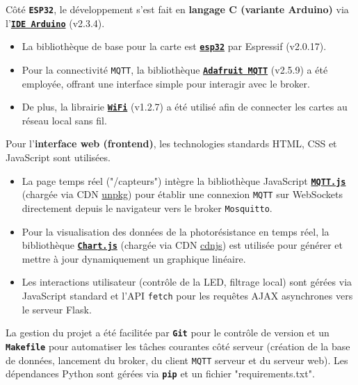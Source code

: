 \documentclass[12pt]{article}
\begin{document}
Côté \textbf{\texttt{ESP32}}, le développement s'est fait en \textbf{langage C (variante Arduino)} via l'\textbf{\href{https://www.arduino.cc/}{\texttt{IDE Arduino}}} (v2.3.4).
\begin{itemize}
    \item La bibliothèque de base pour la carte est \textbf{\href{https://github.com/espressif/arduino-esp32}{\texttt{esp32}}} par Espressif (v2.0.17).
    \item Pour la connectivité \texttt{MQTT}, la bibliothèque \textbf{\href{https://docs.arduino.cc/libraries/adafruit-mqtt-library/}{\texttt{Adafruit MQTT}}} (v2.5.9) a été employée, offrant une interface simple pour interagir avec le broker.
    \item De plus, la librairie \textbf{\href{https://docs.arduino.cc/libraries/wifi/}{\texttt{WiFi}}} (v1.2.7) a été utilisé afin de connecter les cartes au réseau local sans fil.
\end{itemize} \hfill \break

Pour l'\textbf{interface web (frontend)}, les technologies standards HTML, CSS et JavaScript sont utilisées.
\begin{itemize}
    \item La page temps réel ("/capteurs") intègre la bibliothèque JavaScript \textbf{\href{https://github.com/mqttjs/MQTT.js/}{\texttt{MQTT.js}}} (chargée via CDN \href{https://unpkg.com/}{unpkg}) pour établir une connexion \texttt{MQTT} sur WebSockets directement depuis le navigateur vers le broker \texttt{Mosquitto}.
    \item Pour la visualisation des données de la photorésistance en temps réel, la bibliothèque \textbf{\href{https://www.chartjs.org/}{\texttt{Chart.js}}} (chargée via CDN \href{https://cdnjs.com/}{cdnjs}) est utilisée pour générer et mettre à jour dynamiquement un graphique linéaire.
    \item Les interactions utilisateur (contrôle de la LED, filtrage local) sont gérées via JavaScript standard et l'API \texttt{fetch} pour les requêtes AJAX asynchrones vers le serveur Flask.
\end{itemize} \hfill \break

La gestion du projet a été facilitée par \textbf{\texttt{Git}} pour le contrôle de version et un \textbf{\texttt{Makefile}} pour automatiser les tâches courantes côté serveur (création de la base de données, lancement du broker, du client \texttt{MQTT} serveur et du serveur web). Les dépendances Python sont gérées via \textbf{\texttt{pip}} et un fichier "requirements.txt".
\end{document}

